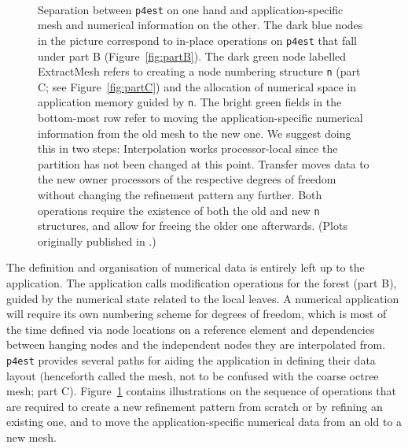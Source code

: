 \documentclass[letterpaper,11pt]{article}
\newcommand{\pforest}{\texttt{p4est}\xspace}
\newcommand{\figref}[1]{Figure~\ref{fig:#1}}
\begin{document}
\begin{figure}
\begin{center}
  \\
\end{center}
\caption{Separation between \pforest on one hand and application-specific mesh
  and numerical information on the other.
  The dark blue nodes in the picture correspond to in-place operations on
  \pforest that fall under part B (\figref{partB}).  The dark green node labelled
  ExtractMesh refers to creating a node numbering structure \texttt{n} (part C;
  see \figref{partC}) and the allocation of numerical space in application
  memory guided by \texttt{n}.  The bright green fields in the bottom-most row refer
  to moving the application-specific numerical information from the old mesh to
  the new one.  We suggest doing this in two steps: Interpolation works
  processor-local since the partition has not been changed at this point.
  Transfer moves data to the new owner processors of the respective degrees of
  freedom without changing the refinement pattern any further.  Both operations
  require the existence of both the old and
  new \texttt{n} structures, and allow for freeing the older one afterwards.
  (Plots originally published in \cite{BursteddeGhattasStadlerEtAl08}.)
}%
\label{fig:meshes}%
\end{figure}%

The definition and organisation of numerical data is entirely left up to the
application.  The application calls modification operations for the forest
(part B), guided by the numerical state related to the local leaves.  A
numerical application will require its own numbering scheme for degrees of
freedom, which is most of the time defined via node locations on a reference
element and dependencies between hanging nodes and the independent nodes they
are interpolated from.  \pforest provides several paths for aiding the
application in defining their data layout (henceforth called the mesh, not to
be confused with the coarse octree mesh; part C).  \figref{meshes} contains
illustrations on the sequence of operations that are required to create a new
refinement pattern from scratch or by refining an existing one, and to move
the application-specific numerical data from an old to a new mesh.



\end{document}
